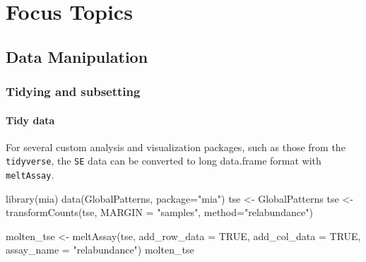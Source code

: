 \documentclass[
]{book}
\newenvironment{Shaded}{\begin{snugshade}}{\end{snugshade}}
\newcommand{\AttributeTok}[1]{\textcolor[rgb]{0.77,0.63,0.00}{#1}}
\newcommand{\ConstantTok}[1]{\textcolor[rgb]{0.00,0.00,0.00}{#1}}
\newcommand{\FunctionTok}[1]{\textcolor[rgb]{0.00,0.00,0.00}{#1}}
\newcommand{\NormalTok}[1]{#1}
\newcommand{\OtherTok}[1]{\textcolor[rgb]{0.56,0.35,0.01}{#1}}
\newcommand{\StringTok}[1]{\textcolor[rgb]{0.31,0.60,0.02}{#1}}
\begin{document}
\hypertarget{part-focus-topics}{%
\part{Focus Topics}\label{part-focus-topics}}

\hypertarget{datamanipulation}{%
\chapter{Data Manipulation}\label{datamanipulation}}

\hypertarget{tidying-and-subsetting}{%
\section{Tidying and subsetting}\label{tidying-and-subsetting}}

\hypertarget{tidy-data}{%
\subsection{Tidy data}\label{tidy-data}}

For several custom analysis and visualization packages, such as those from the
\texttt{tidyverse}, the \texttt{SE} data can be converted to long data.frame format with
\texttt{meltAssay}.

\begin{Shaded}
\begin{Highlighting}[]
\FunctionTok{library}\NormalTok{(mia)}
\FunctionTok{data}\NormalTok{(GlobalPatterns, }\AttributeTok{package=}\StringTok{"mia"}\NormalTok{)}
\NormalTok{tse }\OtherTok{\textless{}{-}}\NormalTok{ GlobalPatterns}
\NormalTok{tse }\OtherTok{\textless{}{-}} \FunctionTok{transformCounts}\NormalTok{(tse, }\AttributeTok{MARGIN =} \StringTok{"samples"}\NormalTok{, }\AttributeTok{method=}\StringTok{"relabundance"}\NormalTok{)}

\NormalTok{molten\_tse }\OtherTok{\textless{}{-}} \FunctionTok{meltAssay}\NormalTok{(tse,}
                        \AttributeTok{add\_row\_data =} \ConstantTok{TRUE}\NormalTok{,}
                        \AttributeTok{add\_col\_data =} \ConstantTok{TRUE}\NormalTok{,}
                        \AttributeTok{assay\_name =} \StringTok{"relabundance"}\NormalTok{)}
\NormalTok{molten\_tse}
\end{Highlighting}
\end{Shaded}
\end{document}
